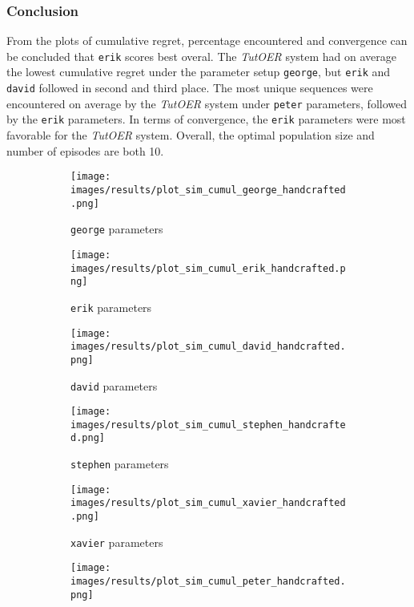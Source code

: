 \subsubsection*{Conclusion}
From the plots of cumulative regret, percentage encountered and convergence can
be concluded that \texttt{erik} scores best overal. The \emph{TutOER} system
had on average the lowest cumulative regret under the parameter setup
\texttt{george}, but \texttt{erik} and \texttt{david} followed in second and
third place. The most unique sequences were encountered on average by the
\emph{TutOER} system under \texttt{peter} parameters, followed by the
\texttt{erik} parameters. In terms of convergence, the \texttt{erik} parameters
were most favorable for the \emph{TutOER} system. Overall, the optimal
population size and number of episodes are both 10.
\begin{figure}[ht]
	\begin{subfigure}{0.48\linewidth}
	\texttt{[image: images/results/plot\_sim\_cumul\_george\_handcrafted.png]}
	\caption{\texttt{george} parameters}
	\label{fig:cumul_handcrafted_george}
	\end{subfigure}
	\hfill
	\begin{subfigure}{0.48\linewidth}
	\texttt{[image: images/results/plot\_sim\_cumul\_erik\_handcrafted.png]}
	\caption{\texttt{erik} parameters}
	\label{fig:cumul_handcrafted_erik}
	\end{subfigure}
	\begin{subfigure}{0.48\linewidth}
	\texttt{[image: images/results/plot\_sim\_cumul\_david\_handcrafted.png]}
	\caption{\texttt{david} parameters}
	\label{fig:cumul_handcrafted_david}
	\end{subfigure}
	\hfill
	\begin{subfigure}{0.48\linewidth}
	\texttt{[image: images/results/plot\_sim\_cumul\_stephen\_handcrafted.png]}
	\caption{\texttt{stephen} parameters}
	\label{fig:cumul_handcrafted_stephen}
	\end{subfigure}
	\begin{subfigure}{0.48\linewidth}
	\texttt{[image: images/results/plot\_sim\_cumul\_xavier\_handcrafted.png]}
	\caption{\texttt{xavier} parameters}
	\label{fig:cumul_handcrafted_xavier}
	\end{subfigure}
	\hfill
	\begin{subfigure}{0.48\linewidth}
	\texttt{[image: images/results/plot\_sim\_cumul\_peter\_handcrafted.png]}

\end{subfigure}
\end{figure}
